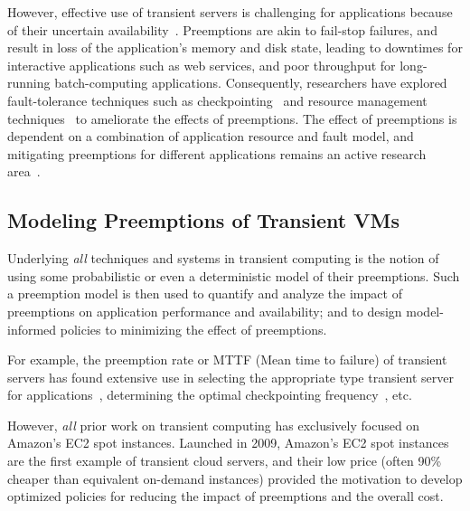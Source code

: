 However, effective use of transient servers is challenging for applications because of their uncertain availability~\cite{spotcheck, prateek-thesis}. 
Preemptions are akin to fail-stop failures, and result in loss of the application's memory and disk state, leading to downtimes for interactive applications such as web services, and poor throughput for long-running batch-computing applications. 
Consequently, researchers have explored fault-tolerance techniques such as checkpointing~\cite{flint, marathe2014exploiting, spoton} and resource management techniques~\cite{exosphere} to ameliorate the effects of preemptions. %
The effect of preemptions is dependent on a combination of application resource and fault model, and mitigating preemptions for different applications remains an active research area~\cite{hourglass-eurosys19}.




\subsection{Modeling Preemptions of Transient VMs}


Underlying \emph{all} techniques and systems in transient computing is the notion of using some probabilistic or even a deterministic model of their preemptions.
Such a preemption model is then used to quantify and analyze the impact of preemptions on application performance and availability; and to design model-informed policies to minimizing the effect of preemptions.

For example, the preemption rate or MTTF (Mean time to failure) of transient servers has found extensive use in selecting the appropriate type transient server for applications~\cite{exosphere, spoton}, determining the optimal checkpointing frequency~\cite{flint, marathe2014exploiting, proteus-eur17, spark-ckpt-hpdc}, etc.

However, \emph{all} prior work on transient computing has exclusively focused on Amazon's EC2 spot instances.
Launched in 2009, Amazon's EC2 spot instances are the first example of transient cloud servers, and their low price (often 90\% cheaper than equivalent on-demand instances) provided the motivation to develop optimized policies for reducing the impact of preemptions and the overall cost. 

